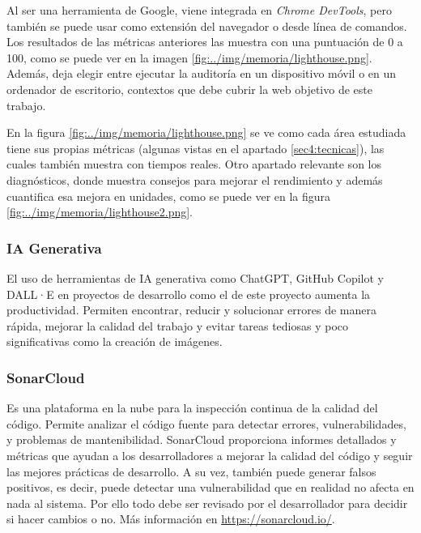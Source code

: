 Al ser una herramienta de Google, viene integrada en \textit{Chrome DevTools}, pero también se puede usar como extensión del navegador o desde línea de comandos. Los resultados de las métricas anteriores las muestra con una puntuación de 0 a 100, como se puede ver en la imagen \ref{fig:../img/memoria/lighthouse.png}. Además, deja elegir entre ejecutar la auditoría en un dispositivo móvil o en un ordenador de escritorio, contextos que debe cubrir la web objetivo de este trabajo.


En la figura \ref{fig:../img/memoria/lighthouse.png} se ve como cada área estudiada tiene sus propias métricas (algunas vistas en el apartado \ref{sec4:tecnicas}), las cuales también muestra con tiempos reales. Otro apartado relevante son los diagnósticos, donde muestra consejos para mejorar el rendimiento y además cuantifica esa mejora en unidades, como se puede ver en la figura \ref{fig:../img/memoria/lighthouse2.png}.


\subsubsection{IA Generativa}
El uso de herramientas de IA generativa como ChatGPT, GitHub Copilot y DALL·E en proyectos de desarrollo como el de este proyecto aumenta la productividad. Permiten encontrar, reducir y solucionar errores de manera rápida, mejorar la calidad del trabajo y evitar tareas tediosas y poco significativas como la creación de imágenes.

\subsubsection{SonarCloud}
Es una plataforma en la nube para la inspección continua de la calidad del código. Permite analizar el código fuente para detectar errores, vulnerabilidades, y problemas de mantenibilidad. SonarCloud proporciona informes detallados y métricas que ayudan a los desarrolladores a mejorar la calidad del código y seguir las mejores prácticas de desarrollo. A su vez, también puede generar falsos positivos, es decir, puede detectar una vulnerabilidad que en realidad no afecta en nada al sistema. Por ello todo debe ser revisado por el desarrollador para decidir si hacer cambios o no. Más información en \url{https://sonarcloud.io/}.


